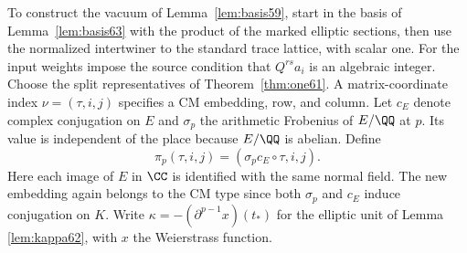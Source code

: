 \documentclass[a4paper,11pt]{article}
\theoremstyle{definition}
\theoremstyle{remark}
\numberwithin{equation}{section}
\begin{document}
To construct the vacuum of Lemma~\ref{lem:basis59}, start in the
basis of Lemma~\ref{lem:basis63} with the product of the marked
elliptic sections, then use the normalized intertwiner
to the standard trace lattice, with scalar one. For the input
weights impose the source condition that \(Q^{rs}a_i\) is an
algebraic integer. Choose the split representatives of
Theorem~\ref{thm:one61}. A matrix-coordinate index
\(\nu=(\tau,i,j)\) specifies a CM embedding, row, and column.
Let \(c_E\) denote complex conjugation on \(E\) and \(\sigma_p\)
the arithmetic Frobenius of \(E/\QQ\) at \(p\). Its value is
independent of the place because \(E/\QQ\) is abelian. Define
\[
    \pi_p(\tau,i,j)=(\sigma_p c_E\circ\tau,i,j).
\]
Here each image of \(E\) in \(\CC\) is identified with the same
normal field. The new embedding again belongs to the CM type
since both \(\sigma_p\) and \(c_E\) induce conjugation on \(K\).
Write \(\kappa=-(\partial^{p-1}x)(t_*)\) for the elliptic unit
of Lemma \ref{lem:kappa62}, with \(x\) the Weierstrass function.
\end{document}
